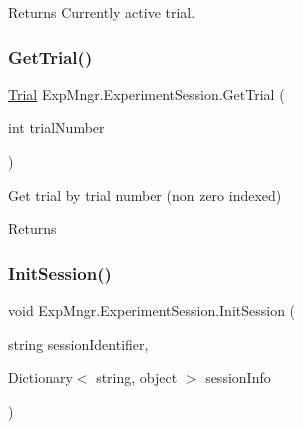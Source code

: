 \begin{DoxyReturn}{Returns}
Currently active trial.
\end{DoxyReturn}
\mbox{\label{class_exp_mngr_1_1_experiment_session_ae5a59eb1992dfcf48f96cce11a94455e}} 
\subsubsection{\texorpdfstring{Get\+Trial()}{GetTrial()}\hspace{0.1cm}{\footnotesize\ttfamily [2/2]}}
{\footnotesize\ttfamily \hyperlink{class_exp_mngr_1_1_trial}{Trial} Exp\+Mngr.\+Experiment\+Session.\+Get\+Trial (\begin{DoxyParamCaption}\item[{int}]{trial\+Number }\end{DoxyParamCaption})}



Get trial by trial number (non zero indexed) 

\begin{DoxyReturn}{Returns}

\end{DoxyReturn}
\mbox{\label{class_exp_mngr_1_1_experiment_session_a251a75fb62c3fe759e3af6fdfbf8c1ee}} 
\subsubsection{\texorpdfstring{Init\+Session()}{InitSession()}\hspace{0.1cm}{\footnotesize\ttfamily [1/2]}}
{\footnotesize\ttfamily void Exp\+Mngr.\+Experiment\+Session.\+Init\+Session (\begin{DoxyParamCaption}\item[{string}]{session\+Identifier,  }\item[{Dictionary$<$ string, object $>$}]{session\+Info }\end{DoxyParamCaption})}



